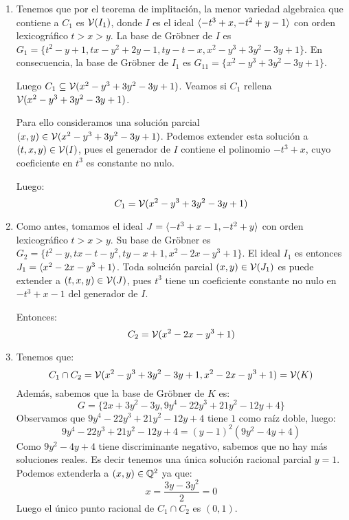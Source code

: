 \documentclass[twoside]{article}
\begin{document}
\begin{solucion}
\mbox{}
\begin{enumerate}
\item Tenemos que por el teorema de implitación, la menor variedad algebraica que contiene a $C_1$ es $\mathcal{V}(I_1)$, donde $I$ es el ideal $\langle{-t^3 + x, -t^2+y-1}\rangle$ con orden lexicográfico $t > x > y$.
La base de Gröbner de $I$ es $G_1 = \{t^2-y+1, tx-y^2+2y-1, ty-t-x, x^2-y^3+3y^2-3y+1\}$.
En consecuencia, la base de Gröbner de $I_1$ es $G_{11} = \{x^2-y^3+3y^2-3y+1\}$.

Luego $C_1 \subseteq \mathcal{V}(x^2-y^3+3y^2-3y+1)$.
Veamos si $C_1$ rellena $\mathcal{V}(x^2-y^3+3y^2-3y+1)$.

Para ello consideramos una solución parcial $(x,y) \in \mathcal{V}(x^2-y^3+3y^2-3y+1)$.
Podemos extender esta solución a $(t,x,y) \in \mathcal{V}(I)$, pues el generador de $I$ contiene el polinomio $-t^3+x$, cuyo coeficiente en $t^3$ es constante no nulo.

Luego:
\[ C_1 = \mathcal{V}(x^2-y^3+3y^2-3y+1)\]

\item Como antes, tomamos el ideal $J=\langle{-t^3 + x - 1, -t^2 + y}\rangle$ con orden lexicográfico $t > x > y$.
Su base de Gröbner es $G_2 = \{t^2-y, tx-t-y^2, ty-x+1, x^2-2x-y^3+1\}$.
El ideal $I_1$ es entonces $J_1 = \langle{x^2-2x-y^3+1}\rangle$.
Toda solución parcial $(x,y) \in \mathcal{V}(J_1)$ es puede extender a $(t,x,y) \in \mathcal{V}(J)$, pues $t^3$ tiene un coeficiente constante no nulo en $-t^3+x-1$ del generador de $I$.

Entonces:
\[ C_2 = \mathcal{V}(x^2-2x-y^3+1) \]

\item Tenemos que:
\[ C_1 \cap C_2 = \mathcal{V}(x^2-y^3+3y^2-3y+1, x^2-2x-y^3+1) = \mathcal{V}(K) \]
Además, sabemos que la base de Gröbner de $K$ es:
\[ G = \{2x+3y^2-3y, 9y^4-22y^3 + 21y^2 - 12y + 4\} \]
Observamos que $9y^4-22y^3+21y^2-12y+4$ tiene $1$ como raíz doble, luego:
\[ 9y^4-22y^3+21y^2-12y+4 = (y-1)^2 (9y^2 - 4y + 4)\]
Como $9y^2-4y+4$ tiene discriminante negativo, sabemos que no hay más soluciones reales.
Es decir tenemos una única solución racional parcial $y=1$.
Podemos extenderla a $(x,y) \in \mathbb{Q}^2$ ya que:
\[ x = \frac{3y-3y^2}{2} = 0 \]
Luego el único punto racional de $C_1 \cap C_2$ es $(0,1)$.

\end{enumerate}
\end{solucion}
\end{document}
